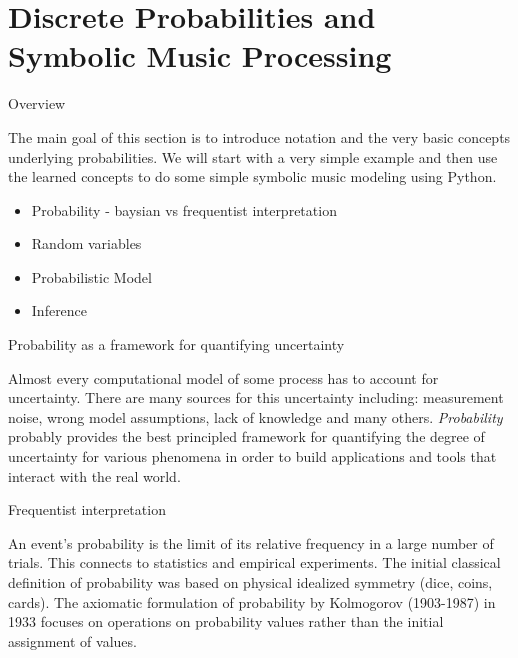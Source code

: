\documentclass[12pt]{beamer}
\begin{document}
\section{Discrete Probabilities and Symbolic Music Processing}

\begin{frame}{Overview}

  The main goal of this section is to introduce notation and the very
  basic concepts underlying probabilities. We will start with a very
  simple example and then use the learned concepts to do some simple
  symbolic music modeling using Python.

  \begin{itemize}
  \item{Probability - baysian vs frequentist interpretation}
  \item{Random variables}
  \item{Probabilistic Model}
  \item{Inference}
  \end{itemize} 
\end{frame} 




\begin{frame}{Probability as a framework for quantifying uncertainty} 

  Almost every computational model of some process has to account for
  uncertainty. There are many sources for this uncertainty including:
  measurement noise, wrong model assumptions, lack of knowledge and
  many others. {\it Probability} probably provides the best principled
  framework for quantifying the degree of uncertainty for various
  phenomena in order to build applications and tools that interact
  with the real world.
\end{frame}



\begin{frame}{Frequentist interpretation} 

An event's probability is the limit of its relative frequency in a
large number of trials. This connects to statistics and empirical
experiments.  The initial classical definition of probability was
based on physical idealized symmetry (dice, coins, cards). The
axiomatic formulation of probability by Kolmogorov (1903-1987) in 1933
focuses on operations on probability values rather than the initial
assignment of values.

\end{frame} 
\end{document}
